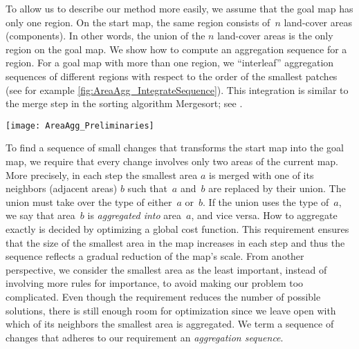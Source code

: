 To allow us to describe our method more easily,
we assume that the goal map has only one region. 
On the start map, the same region consists of~$n$ land-cover 
areas (components). 
In other words, the union of the $n$ land-cover areas 
is the only region on the goal map.  
We show how to compute an aggregation sequence for a region. 
For a goal map with more than one region, 
we ``interleaf'' aggregation sequences of different regions
with respect to the order of the smallest patches 
(see for example \fig\ref{fig:AreaAgg_IntegrateSequence}).
This integration is similar to the merge step in the 
sorting algorithm Mergesort; 
see \textcite[pp.~29--37]{Cormen2009}.
\begin{figure*}[tb]
	\centering
	\texttt{[image: AreaAgg\_Preliminaries]}
	\caption{Integrating two aggregation sequences of different 
		regions: the resulting sequence contains the given 
		sequences as
		subsequences and always takes the subdivision with 
		smallest
		patch next}
	\label{fig:AreaAgg_IntegrateSequence}
\end{figure*}


To find a sequence of small changes that transforms the start 
map into the goal map,
we require that every change involves only two areas of the 
current map.
More precisely, in each step the smallest area $a$ is merged 
with one of its neighbors (adjacent areas) $b$
such that~$a$ and~$b$ are replaced by their union.
The union must take over the type of either~$a$ or~$b$. 
If the union uses the type of~$a$, 
we say that area~$b$ is \emph{aggregated into} area~$a$, 
and vice versa. 
How to aggregate exactly is decided by 
optimizing a global cost function.
This requirement ensures that the 
size of the smallest area in the map increases in each step
and thus the sequence reflects a gradual reduction of the 
map's scale.
From another perspective, 
we consider the smallest area as the least important, 
instead of involving more rules for importance, 
to avoid making our problem too complicated. 
Even though the requirement reduces the number of possible 
solutions,
there is still enough room for optimization 
since we leave open with
which of its neighbors the smallest area is aggregated.
We term a sequence of changes that adheres to our requirement an
\emph{aggregation sequence}.



